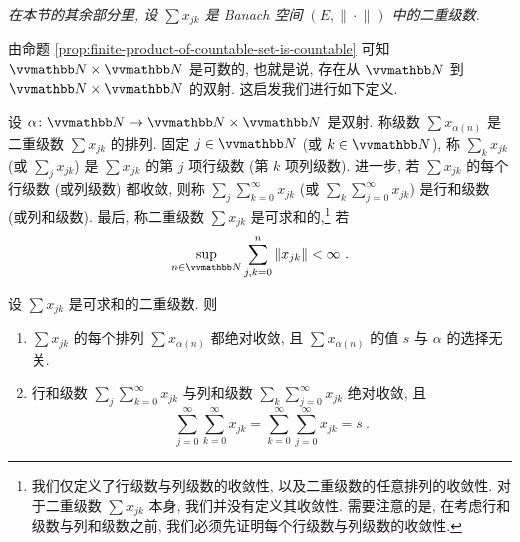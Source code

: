 \begin{center}
    \textsl{在本节的其余部分里, 设 \(\sum x_{j k}\) 是 Banach 空间 \((E, \|\!\cdot\!\|)\) 中的二重级数.}
\end{center}

由命题 \ref{prop:finite-product-of-countable-set-is-countable} 可知 \(\N \times \N\) 是可数的, 也就是说, 存在从 \(\N\) 到 \(\N \times \N\) 的双射. 这启发我们进行如下定义.

\begin{definition}[可求和]
    设 \(\alpha \colon \N \to \N \times \N\) 是双射. 称级数 \(\sum x_{\alpha(n)}\) 是二重级数 \(\sum x_{j k}\) 的排列. 固定 \(j \in \N\) (或 \(k \in \N\)), 称 \(\sum_k x_{j k}\) (或 \(\sum_j x_{j k}\)) 是 \(\sum x_{j k}\) 的第 \(j\) 项行级数 (第 \(k\) 项列级数). 进一步, 若 \(\sum x_{j k}\) 的每个行级数 (或列级数) 都收敛, 则称 \(\sum_j \sum_{k = 0}^\infty x_{j k}\) (或 \(\sum_k \sum_{j = 0}^\infty x_{j k}\)) 是行和级数 (或列和级数). 最后, 称二重级数 \(\sum x_{j k}\) 是可求和的,\footnote{我们仅定义了行级数与列级数的收敛性, 以及二重级数的任意排列的收敛性. 对于二重级数 \(\sum x_{j k}\) 本身, 我们并没有定义其收敛性. 需要注意的是, 在考虑行和级数与列和级数之前, 我们必须先证明每个行级数与列级数的收敛性.} 若
    \[
        \sup_{n \in \N} \sum_{j, k = 0}^n \|x_{j k}\| < \infty\ .
    \]
\end{definition}

\begin{theorem}[二重级数定理]
    设 \(\sum x_{j k}\) 是可求和的二重级数. 则
    \begin{enumerate}
        \item \(\sum x_{j k}\) 的每个排列 \(\sum x_{\alpha(n)}\) 都绝对收敛, 且 \(\sum x_{\alpha(n)}\) 的值 \(s\) 与 \(\alpha\) 的选择无关.
        \item 行和级数 \(\sum_j \sum_{k = 0}^\infty x_{j k}\) 与列和级数 \(\sum_k \sum_{j = 0}^\infty x_{j k}\) 绝对收敛, 且
        \[
            \sum_{j = 0}^\infty \sum_{k = 0}^\infty x_{j k} = \sum_{k = 0}^\infty \sum_{j = 0}^\infty x_{j k} = s\ .
        \]
    \end{enumerate}
\end{theorem}

